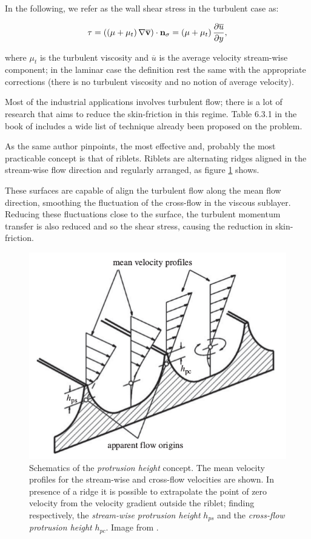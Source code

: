 In the following, we refer as the wall shear stress in the turbulent case as:

\begin{equation}
\tau = \left( \left( \mu + \mu_t \right)  \nabla \mathbf{\overline{v}} \right) \cdot  \mathbf{n}_{\sigma} = \left( \mu + \mu_t \right) \frac{\partial \overline{u}}{\partial y},
\end{equation}

where $\mu_t$ is the turbulent viscosity and $\overline{u}$ is the average velocity stream-wise component; in the laminar case the definition rest the same with the appropriate corrections (there is no turbulent viscosity and no notion of average velocity).

Most of the industrial applications involves turbulent flow; there is a lot of research that aims to reduce the skin-friction in this regime.
Table 6.3.1 in the book of \citet{mclean2012understanding} includes a wide list of technique already been proposed on the problem.

As the same author pinpoints, the most effective and, probably the most practicable concept is that of riblets.
Riblets are alternating ridges aligned in the stream-wise flow direction and regularly arranged, as figure \ref{fig:riblets1} shows.

These surfaces are capable of align the turbulent flow along the mean flow direction, smoothing the fluctuation of the cross-flow in the viscous sublayer.
Reducing these fluctuations close to the surface, the turbulent momentum transfer is also reduced and so the shear stress, causing the reduction in skin-friction.

\begin{figure}[h]
	\centering
	\includegraphics[width=0.7\linewidth]{chapter_1/riblets3}
	\caption{Schematics of the  \textit{protrusion height} concept. The mean velocity profiles for the stream-wise and cross-flow velocities are shown. In presence of a ridge it is possible to extrapolate the point of zero velocity from the velocity gradient outside the riblet; finding respectively, the \textit{stream-wise protrusion height} $h_{ps}$ and the \textit{cross-flow protrusion height} $h_{pc}$. Image from \citet{bechert1997experiments}.}
	\label{fig:riblets1}
\end{figure}


